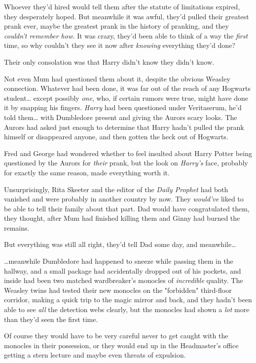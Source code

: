 Whoever they'd hired would tell them after the statute of limitations expired,
they desperately hoped. But meanwhile it was awful, they'd pulled their
greatest prank ever, maybe the greatest prank in the history of pranking, and
they \emph{couldn't remember how.} It was crazy, they'd been able to think of a
way the \emph{first} time, so why couldn't they see it now after \emph{knowing}
everything they'd done?

Their only consolation was that Harry didn't know they didn't know.

Not even Mum had questioned them about it, despite the obvious Weasley
connection. Whatever had been done, it was far out of the reach of any Hogwarts
student{\ldots} except possibly \emph{one}, who, if certain rumors were true,
might have done it by snapping his fingers. \emph{Harry} had been questioned
under Veritaserum, he'd told them{\ldots} with Dumbledore present and giving
the Aurors scary looks. The Aurors had asked just enough to determine that
Harry hadn't pulled the prank himself or disappeared anyone, and then gotten
the heck out of Hogwarts.

Fred and George had wondered whether to feel insulted about Harry Potter being
questioned by the Aurors for \emph{their} prank, but the look on \emph{Harry's}
face, probably for exactly the same reason, made everything worth it.

Unsurprisingly, Rita Skeeter and the editor of the \emph{Daily Prophet} had
both vanished and were probably in another country by now. They \emph{would've}
liked to be able to tell their family about that part. Dad would have
congratulated them, they thought, after Mum had finished killing them and Ginny
had burned the remains.

But everything was still all right, they'd tell Dad some day, and
meanwhile{\ldots}

{\ldots}meanwhile Dumbledore had happened to sneeze while passing them in the
hallway, and a small package had accidentally dropped out of his pockets, and
inside had been two matched wardbreaker's monocles of \emph{incredible}
quality. The Weasley twins had tested their new monocles on the "forbidden"
third-floor corridor, making a quick trip to the magic mirror and back, and
they hadn't been able to see \emph{all} the detection webs clearly, but the
monocles had shown a \emph{lot} more than they'd seen the first time.

Of course they would have to be very careful never to get caught with the
monocles in their possession, or they would end up in the Headmaster's office
getting a stern lecture and maybe even threats of expulsion.

